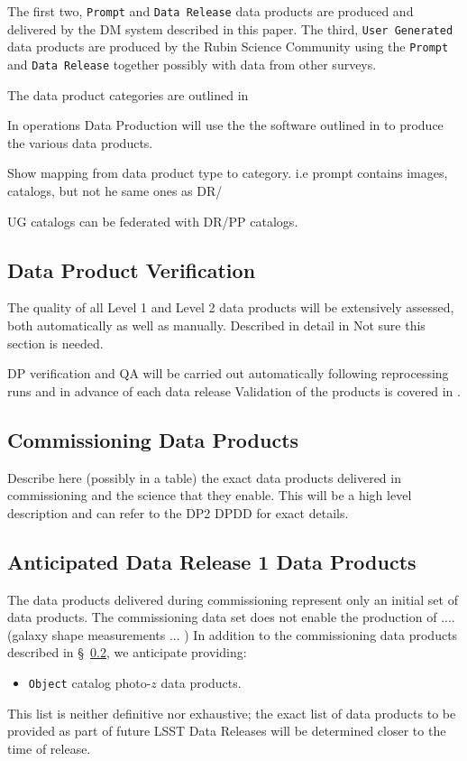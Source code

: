 The first two, {\tt Prompt} and {\tt Data Release} data products are produced and delivered by the DM system described in this paper. 
The third, {\tt User Generated} data products are produced by the Rubin Science Community using the {\tt Prompt} and {\tt Data Release} together possibly with data from other surveys. 

The data product categories are outlined in \cite{LPM-231}

In operations Data Production will use the the software outlined in  to produce the various data products.

Show mapping from data product type to category. i.e prompt contains images, catalogs, but not he same ones as DR/ 

UG catalogs can be federated with DR/PP catalogs. 


\subsection{Data Product Verification}
The quality of all Level 1 and Level 2 data products will be extensively assessed, both automatically as well as manually. 
Described in detail in \cite{pstn-024}
Not sure this section is needed. 

DP verification and QA will be carried out automatically following reprocessing runs and in advance of each data release 
Validation of the products is covered in \cite{PSTN-024}.


\subsection{Commissioning Data Products}  \label{sec:dp-commissioning}
Describe here (possibly in a table) the exact data products delivered in commissioning and the science that they enable. 
This will be a high level description and can refer to the DP2 DPDD for exact details. 

\subsection{Anticipated Data Release 1 Data Products} \label{sec:dp-dr1}

The data products delivered during commissioning represent only an initial set of data products. 
The commissioning data set does not enable the production of .... (galaxy shape measurements ... )
In addition to the commissioning data products described in \S~\ref{sec:dp-commissioning}, we anticipate providing: 

\begin{itemize}
\item {\tt Object} catalog photo-$z$ data products.
\end{itemize}
This list is neither definitive nor exhaustive; the exact list of data products to be provided as part of future LSST Data Releases will be determined closer to the time of release. 
